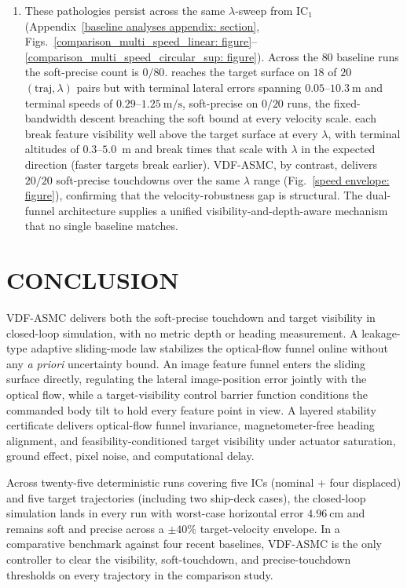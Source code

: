 \documentclass{IEEEtaes}
\begin{document}
\begin{enumerate}
    \item These pathologies persist across the same $\lambda$-sweep from IC$_1$ (Appendix~\ref{baseline analyses appendix: section}, Figs.~\ref{comparison_multi_speed_linear: figure}--\ref{comparison_multi_speed_circular_sup: figure}). Across the $80$ baseline runs the soft-precise count is $0/80$. \cite{zhang2026} reaches the target surface on $18$ of $20$ $(\text{traj},\lambda)$ pairs but with terminal lateral errors spanning $0.05$--$10.3~\text{m}$ and terminal speeds of $0.29$--$1.25~\text{m/s}$, soft-precise on $0/20$ runs, the fixed-bandwidth descent breaching the soft bound at every velocity scale. \cite{lin2022,lin2023,cho2022} each break feature visibility well above the target surface at every $\lambda$, with terminal altitudes of $0.3$--$5.0$~m and break times that scale with $\lambda$ in the expected direction (faster targets break earlier). VDF-ASMC, by contrast, delivers $20/20$ soft-precise touchdowns over the same $\lambda$ range (Fig.~\ref{speed envelope: figure}), confirming that the velocity-robustness gap is structural. The dual-funnel architecture supplies a unified visibility-and-depth-aware mechanism that no single baseline matches.
\end{enumerate}

\section{CONCLUSION}
\label{conclusion: section}
VDF-ASMC delivers both the soft-precise touchdown and target visibility in closed-loop simulation, with no metric depth or heading measurement. A leakage-type adaptive sliding-mode law stabilizes the optical-flow funnel online without any \emph{a priori} uncertainty bound. An image feature funnel enters the sliding surface directly, regulating the lateral image-position error jointly with the optical flow, while a target-visibility control barrier function conditions the commanded body tilt to hold every feature point in view. A layered stability certificate delivers optical-flow funnel invariance, magnetometer-free heading alignment, and feasibility-conditioned target visibility under actuator saturation, ground effect, pixel noise, and computational delay.

Across twenty-five deterministic runs covering five ICs (nominal $+$ four displaced) and five target trajectories (including two ship-deck cases), the closed-loop simulation lands in every run with worst-case horizontal error $4.96~\text{cm}$ and remains soft and precise across a $\pm 40\%$ target-velocity envelope. In a comparative benchmark against four recent baselines, VDF-ASMC is the only controller to clear the visibility, soft-touchdown, and precise-touchdown thresholds on every trajectory in the comparison study.
\end{document}
